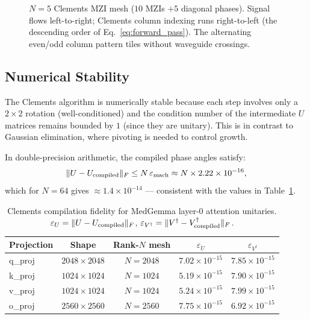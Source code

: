 \documentclass[12pt, a4paper]{article}
\begin{document}
\begin{figure}[H]
\caption{%
  $N=5$ Clements MZI mesh ($10$ MZIs $+ 5$ diagonal phases).
  Signal flows left-to-right; Clements column indexing runs right-to-left
  (the descending order of Eq.~\eqref{eq:forward_pass}).
  The alternating even/odd column pattern tiles without waveguide crossings.%
}
\label{fig:clements_mesh_n5}
\end{figure}

\subsection{Numerical Stability}

The Clements algorithm is numerically stable because each step involves
only a $2\times2$ rotation (well-conditioned) and the condition number of the
intermediate $U$ matrices remains bounded by $1$ (since they are unitary).
This is in contrast to Gaussian elimination, where pivoting is needed to
control growth.

In double-precision arithmetic, the compiled phase angles satisfy:
\begin{equation}
  \|U - U_{\rm compiled}\|_F \leq N\,\varepsilon_{\rm mach}
  \approx N \times 2.22\times10^{-16},
  \label{eq:numerical_stability}
\end{equation}
which for $N=64$ gives $\approx 1.4\times10^{-14}$ --- consistent with the
values in Table~\ref{tab:compilation_fidelity}.

\begin{table}[H]
\centering
\caption{Clements compilation fidelity for MedGemma layer-0 attention unitaries.
  $\varepsilon_U = \|U - U_{\rm compiled}\|_F$,
  $\varepsilon_{V^\dagger} = \|V^\dagger - V^\dagger_{\rm compiled}\|_F$.}
\label{tab:compilation_fidelity}
\begin{tabular}{lcccc}
\toprule
\textbf{Projection} & \textbf{Shape} & \textbf{Rank-$N$ mesh}
& $\varepsilon_U$ & $\varepsilon_{V^\dagger}$ \\
\midrule
q\_proj & $2048\times2048$ & $N=2048$ & $7.02\times10^{-15}$ & $7.85\times10^{-15}$ \\
k\_proj & $1024\times1024$ & $N=1024$ & $5.19\times10^{-15}$ & $7.90\times10^{-15}$ \\
v\_proj & $1024\times1024$ & $N=1024$ & $5.24\times10^{-15}$ & $7.99\times10^{-15}$ \\
o\_proj & $2560\times2560$ & $N=2560$ & $7.75\times10^{-15}$ & $6.92\times10^{-15}$ \\
\bottomrule
\end{tabular}
\end{table}
\end{document}
